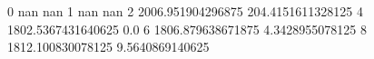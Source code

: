0 nan nan
1 nan nan
2 2006.951904296875 204.4151611328125
4 1802.5367431640625 0.0
6 1806.879638671875 4.3428955078125
8 1812.100830078125 9.5640869140625
